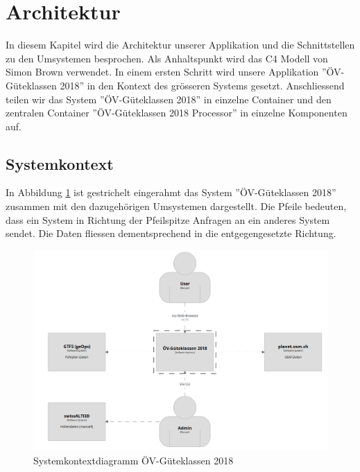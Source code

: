 
\section{Architektur}
\label{Architektur}

In diesem Kapitel wird die Architektur unserer Applikation und die Schnittstellen zu den Umsystemen besprochen.
Als Anhaltspunkt wird das C4 Modell \cite{c4model} von Simon Brown verwendet.
In einem ersten Schritt wird unsere Applikation ''ÖV-Güteklassen 2018'' in den Kontext des grösseren Systems gesetzt.
Anschliessend teilen wir das System ''ÖV-Güteklassen 2018'' in einzelne Container und den zentralen Container ''ÖV-Güteklassen 2018 Processor'' in einzelne Komponenten auf.

\subsection{Systemkontext}
\label{Architektur:Systemkontext}

In Abbildung \ref{fig:system-context-diagram} ist gestrichelt eingerahmt das System ''ÖV-Güteklassen 2018'' zusammen mit den dazugehörigen Umsystemen dargestellt.
Die Pfeile bedeuten, dass ein System in Richtung der Pfeilspitze Anfragen an ein anderes System sendet.
Die Daten fliessen dementsprechend in die entgegengesetzte Richtung.

\begin{figure}[ht]
    \centering
    \includegraphics[width=1\linewidth]{projectdoc/img/systemcontext-diagram.png}
    \caption[Systemkontextdiagramm]{Systemkontextdiagramm ÖV-Güteklassen 2018}
    \label{fig:system-context-diagram}
\end{figure}

